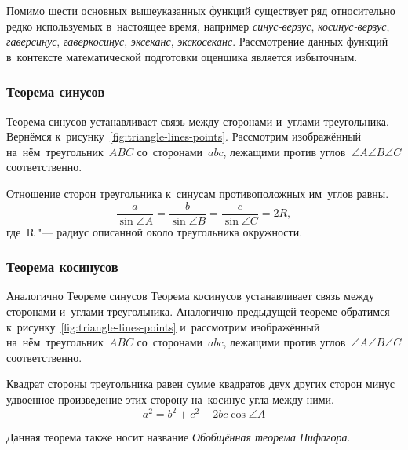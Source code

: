 \documentclass[]{scrartcl}
\begin{document}
Помимо шести основных вышеуказанных функций существует ряд относительно редко используемых в~настоящее время, например \emph{синус-верзус}, \emph{косинус-верзус}, \emph{гаверсинус}, \emph{гаверкосинус}, \emph{эксеканс}, \emph{экскосеканс}. Рассмотрение данных функций в~контексте математической подготовки оценщика является избыточным.

\subsubsection{Теорема синусов}
Теорема синусов устанавливает связь между сторонами и~углами треугольника. Вернёмся к~рисунку~\ref{fig:triangle-lines-points}. Рассмотрим изображённый на~нём~треугольник~${\textstyle ABC}$ со~сторонами~${\textstyle abc}$, лежащими против углов~${\textstyle \angle A \angle B \angle C}$ соответственно.
\begin{newtheorem}
	Отношение сторон треугольника к~синусам противоположных им~углов равны.
	\begin{equation}\label{eq:sinus-theorem}
	\frac{a}{\sin \angle A}=\frac{b}{\sin \angle B}=\frac{c}{\sin \angle C} = 2R,
	\end{equation}
	где~R "--- радиус описанной около треугольника окружности.
\end{newtheorem}

\subsubsection{Теорема косинусов}
Аналогично Теореме синусов Теорема косинусов устанавливает связь между сторонами и~углами треугольника. Аналогично предыдущей теореме обратимся к~рисунку~\ref{fig:triangle-lines-points} и~рассмотрим изображённый на~нём~треугольник~${\textstyle ABC}$ со~сторонами~${\textstyle abc}$, лежащими против углов~${\textstyle \angle A \angle B \angle C}$ соответственно.
\begin{newtheorem}
	Квадрат стороны треугольника равен сумме квадратов двух других сторон минус удвоенное произведение этих сторону на~косинус угла между ними.
	\begin{equation}\label{eq:cosinus-theorem}
	a^2=b^{2}+c^{2}-2bc\cos \angle A
	\end{equation}
\end{newtheorem}
Данная теорема также носит название \emph{Обобщённая теорема Пифагора}.
\end{document}
